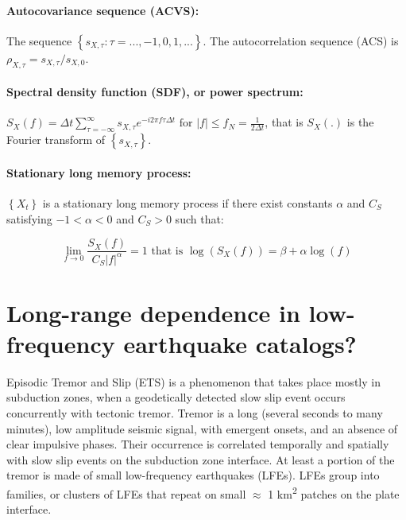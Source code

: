 \documentclass[methods.tex]{subfiles}
\begin{document}
\paragraph{Autocovariance sequence (ACVS):} The sequence $\left\{ s_{X , \tau} : \tau = ... , -1 , 0 , 1 , ... \right\}$. The autocorrelation sequence (ACS) is $\rho_{X , \tau} = s_{X , \tau } / s_{X , 0}$.

\paragraph{Spectral density function (SDF), or power spectrum:} $S_X \left( f \right) = \Delta t \sum_{\tau = - \infty}^{\infty} s_{X , \tau} e^{- i 2 \pi f \tau \Delta t} \text{ for } \left| f \right| \leq f_N = \frac{1}{2 \Delta t}$, that is $S_X \left( . \right)$ is the Fourier transform of $\left\{ s_{X , \tau} \right\}$.

\paragraph{Stationary long memory process:} $\left\{ X_t \right\}$ is a stationary long memory process if there exist constants $\alpha$ and $C_S$ satisfying $ -1 < \alpha < 0$ and $C_S > 0$ such that:

\begin{equation}
\lim_{f \to 0} \frac{S_X \left( f \right)}{C_S \left| f \right| ^{\alpha}} = 1 \text{ that is } \log \left( S_X \left( f \right) \right) = \beta + \alpha \log \left( f \right)
\end{equation}

\newpage

\section{Long-range dependence in low-frequency earthquake catalogs?}

Episodic Tremor and Slip (ETS) is a phenomenon that takes place mostly in subduction zones, when a geodetically detected slow slip event occurs concurrently with tectonic tremor. Tremor is a long (several seconds to many minutes), low amplitude seismic signal, with emergent onsets, and an absence of clear impulsive phases. Their occurrence is correlated temporally and spatially with slow slip events on the subduction zone interface. At least a portion of the tremor is made of small low-frequency earthquakes (LFEs). LFEs group into families, or clusters of LFEs that repeat on small $\approx$ 1 km\textsuperscript{2} patches on the plate interface. \\
\end{document}
